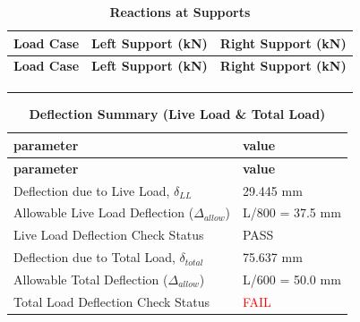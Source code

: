 \documentclass[12pt,a4paper]{report}
\numberwithin{table}{chapter}
\numberwithin{figure}{chapter}
\begin{document}
\vspace{1em}
\begin{longtable}{|>{\centering\arraybackslash}p{5.2cm}|>{\centering\arraybackslash}p{5.2cm}|>{\centering\arraybackslash}p{5.2cm}|}
\caption{\textbf{Reactions at Supports}}
\hline
\rowcolor{tableHead} \textbf{Load Case} & \textbf{Left Support (kN)} & \textbf{Right Support (kN)} \\[6pt]
\hline
\endfirsthead
\hline
\rowcolor{tableHead} \textbf{Load Case} & \textbf{Left Support (kN)} & \textbf{Right Support (kN)} \\[6pt]
\hline
\endhead
 &  &  \\[6pt]
\hline
 &  &  \\[6pt]
\hline
 &  &  \\[6pt]
\hline
\end{longtable}

\vspace{1em}
\begin{longtable}{|L{7cm}|p{8.5cm}|}
\caption{\textbf{Deflection Summary (Live Load \& Total Load)}}
\hline
{} \textbf{parameter} & \textbf{value} \\
\hline
\endfirsthead
\hline
{} \textbf{parameter} & \textbf{value} \\
\hline
\endhead
\textnormal{Deflection due to Live Load, $\delta_{LL}$} & 29.445 mm \\[6pt]
\hline
\textnormal{Allowable Live Load Deflection ($\Delta_{allow}$)} & L/800 = 37.5 mm \\[6pt]
\hline
\textnormal{Live Load Deflection Check Status} & PASS \\[6pt]
\hline
\textnormal{Deflection due to Total Load, $\delta_{total}$} & 75.637 mm \\[6pt]
\hline
\textnormal{Allowable Total Deflection ($\Delta_{allow}$)} & L/600 = 50.0 mm \\[6pt]
\hline
\textnormal{Total Load Deflection Check Status} & \textcolor{red}{FAIL} \\[6pt]
\hline
\end{longtable}
\end{document}
